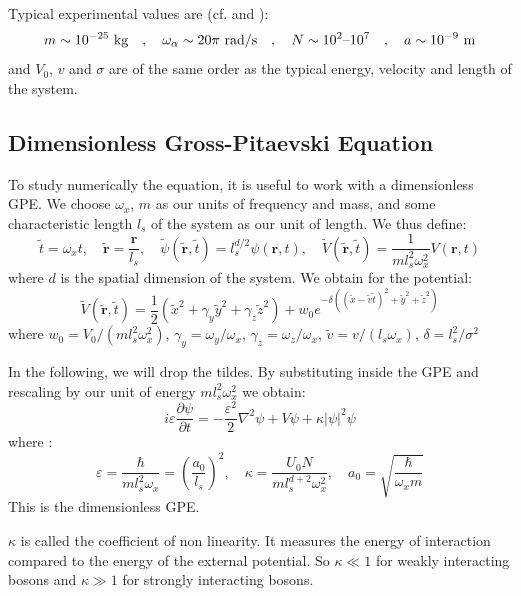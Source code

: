 \documentclass{article}
\begin{document}
\bigskip
Typical experimental values are (cf. \cite{bao1} and \cite{bao2}):
\begin{equation}\label{eqExpVal}
    m\sim10^{-25}\text{ kg}\quad,\quad
    \omega_\alpha\sim20\pi\text{ rad/s}\quad,\quad
    N\sim10^{2}\text{--}10^7\quad,\quad
    a\sim10^{-9}\text{ m}\\
\end{equation}
and $V_0$, $v$ and $\sigma$ are of the same order as the typical energy, velocity and length of the system.

\subsection{Dimensionless Gross-Pitaevski Equation}
To study numerically the equation, it is useful to work with a dimensionless GPE. We choose $\omega_x$, $m$ as our units of frequency and mass, and some characteristic length $l_s$ of the system as our unit of length. We thus define:
\begin{equation}\label{eq:dimensionless-units}
	\tilde{t}=\omega_{x} t, \quad \tilde{\mathbf{r}}=\frac{\mathbf{r}}{l_s}, \quad \tilde{\psi}(\tilde{\mathbf{r}}, \tilde{t})=l_s^{d / 2} \psi(\mathbf{r}, t), \quad
	\tilde{V}(\tilde{\mathbf{r}}, \tilde{t}) =\frac{1}{m l_s^2 \omega_x^2} V(\mathbf{r}, t)
\end{equation}
where $d$ is the spatial dimension of the system. We obtain for the potential:
$$
\tilde{V}(\tilde{\mathbf{r}}, \tilde{t}) =\frac{1}{2}(\tilde{x}^2+\gamma_y \tilde{y}^2+\gamma_z \tilde{z}^2)+w_0 e^{-\delta\left((\tilde{x}-\tilde{v} \tilde{t})^2+\tilde{y}^2+\tilde{z}^2\right)}
$$
where $w_0=V_0/(m l_s^2 \omega_x^2)$, $\gamma_y=\omega_y/\omega_x$, $\gamma_z=\omega_z/\omega_x$, $\tilde{v}=v/(l_s \omega_x)$, $\delta=l_s^2/\sigma^2$

\bigskip \noindent
In the following, we will drop the tildes. By substituting inside the GPE and rescaling by our unit of energy $m l_s^2 \omega_x^2$ we obtain:
\begin{equation}\label{eqDGPE}
    \boxed{i \varepsilon \frac{\partial \psi}{\partial t}=-\frac{\varepsilon^{2}}{2} \nabla^{2} \psi+V \psi+\kappa|\psi|^{2} \psi}
\end{equation}
where :
$$
\varepsilon=\frac{\hbar}{m l_s^{2}\omega_x}=\left(\frac{a_{0}}{l_s}\right)^{2}, \quad \kappa=\frac{U_0 N}{m l_s^{d+2} \omega^2_x}, \quad a_{0}=\sqrt{\frac{\hbar}{\omega_{x} m}}
$$
This is the dimensionless GPE.

\bigskip
$\kappa$ is called the coefficient of non linearity. It measures the energy of interaction compared to the energy of the external potential. So $\kappa\ll 1$ for weakly interacting bosons and $\kappa\gg 1$ for strongly interacting bosons.
\end{document}

